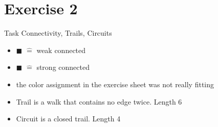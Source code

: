 
\section{Exercise 2}

\setcounter{exercise}{1}

\begin{frame}[allowframebreaks]{Task \thesection}{Connectivity, Trails, Circuits}
    \begin{exercisenoinc}
    \end{exercisenoinc}
    \begin{solution}
        \begin{itemize}
            \item \textcolor{SecondaryColor}{$\blacksquare$} $\hat=$ weak connected
            \item \textcolor{PrimaryColor}{$\blacksquare$} $\hat=$ strong connected
            \item the color assignment in the exercise sheet was not really fitting
        \end{itemize}
    \end{solution}
    \begin{solutionnoinc}
        \begin{itemize}
            \item \alert{Trail} is a walk that contains no edge twice. Length 6
        \end{itemize}
    \end{solutionnoinc}
    \begin{solutionnoinc}
        \begin{itemize}
            \item \alert{Circuit} is a closed trail. Length 4
        \end{itemize}
    \end{solutionnoinc}
\end{frame}
